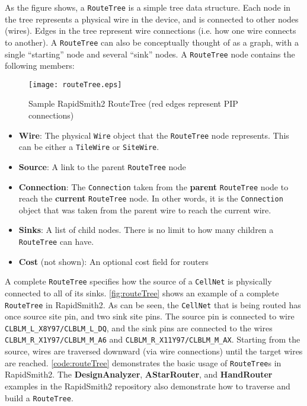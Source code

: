 \noindent
As the figure shows, a \texttt{RouteTree} is a simple tree data structure. Each
node in the tree represents a physical wire in the device, and is connected to
other nodes (wires). Edges in the tree represent wire connections (i.e. how one wire
connects to another). A \texttt{RouteTree} can also be conceptually thought of as
a graph, with a single ``starting'' node and several ``sink'' nodes. A
\texttt{RouteTree} node contains the following members:

\begin{figure}[b!]
\centering
\texttt{[image: routeTree.eps]}
\caption{Sample RapidSmith2 RouteTree (red edges represent PIP connections)}
\label{fig:routeTree}
\end{figure}

\begin{itemize}
  \item \textbf{Wire}: The physical \texttt{Wire} object that the \texttt{RouteTree} node
  represents. This can be either a \texttt{TileWire} or \texttt{SiteWire}.
  
  \item \textbf{Source}: A link to the parent \texttt{RouteTree} node
   
  \item \textbf{Connection}: The \texttt{Connection} taken from the \textbf{parent}
  \texttt{RouteTree} node to reach the \textbf{current} \texttt{RouteTree}
  node. In other words, it is the \texttt{Connection} object that was taken
  from the parent wire to reach the current wire.
  
  \item \textbf{Sinks}: A list of child nodes. There is no limit
  to how many children a \texttt{RouteTree} can have.
  
  \item \textbf{Cost} (not shown): An optional cost field for routers 
\end{itemize}

A complete \texttt{RouteTree} specifies how the source of a
\texttt{CellNet} is physically connected to all of its sinks.
\autoref{fig:routeTree} shows an example of a complete \texttt{RouteTree} in
RapidSmith2. As can be seen, the \texttt{CellNet} that is being routed has once
source site pin, and two sink site pins. The source pin is connected to wire
\texttt{CLBLM\_L\_X8Y97/CLBLM\_L\_DQ}, and the sink pins are connected to the
wires \texttt{CLBLM\_R\_X1Y97/CLBLM\-\_M\_A6} and
\texttt{CLBLM\-\_R\_X11Y97/CLBLM\_M\_AX}. Starting from the source, wires are
traversed downward (via wire connections) until the target wires are reached.
\autoref{code:routeTree} demonstrates the basic usage of \texttt{RouteTree}s in
RapidSmith2. The \textbf{DesignAnalyzer}, \textbf{AStarRouter}, and
\textbf{HandRouter} examples in the RapidSmith2 repository also demonstrate
how to traverse and build a \texttt{RouteTree}.


